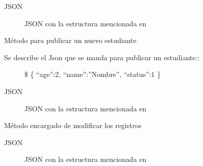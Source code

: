 \documentclass[a4paper,10pt,english]{sphinxmanual}
\begin{document}
\begin{fulllineitems}
\begin{fulllineitems}
\begin{description}
\end{description}
\begin{description}
\item[{JSON}] \leavevmode
\sphinxAtStartPar
JSON con la estructura mencionada en 

\end{description}

\end{fulllineitems}


\begin{fulllineitems}
\label{\detokenize{index:api3.student_api.api_student.ControllerStudent.post}}
\sphinxAtStartPar
Método para publicar un nuevo estudiante
\begin{description}
\item[{Se describe el Json que se manda para publicar un estudiante::}] \leavevmode
\sphinxAtStartPar
\$ \{ “age”:2, “name”:”Nombre”, “status”:1 \}

\end{description}
\begin{description}
\item[{JSON}] \leavevmode
\sphinxAtStartPar
JSON con la estructura mencionada en 

\end{description}

\end{fulllineitems}


\begin{fulllineitems}
\label{\detokenize{index:api3.student_api.api_student.ControllerStudent.put}}
\sphinxAtStartPar
Método encargado de modificar los registros
\begin{description}
\item[{JSON}] \leavevmode
\sphinxAtStartPar
JSON con la estructura mencionada en 

\end{description}

\end{fulllineitems}


\end{fulllineitems}
\end{document}
